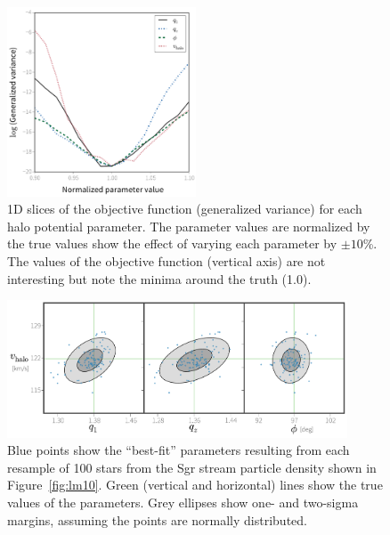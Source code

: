\begin{figure}[t]
\begin{center}
\includegraphics[width=0.5\textwidth]{figures/ch1/fig4.pdf}
\caption{ 1D slices of the objective function (generalized variance) for each halo potential parameter. The parameter values are normalized by the true values show the effect of varying each parameter by $\pm10$\%. The values of the objective function (vertical axis) are not interesting but note the minima around the truth (1.0).}\label{fig:objective}
\end{center}
\end{figure}

\begin{figure}[t]
\centering\includegraphics[width=0.9\textwidth,trim=0 0 0 0, clip]{figures/ch1/fig5.pdf}
\caption{ Blue points show the ``best-fit'' parameters resulting from each resample of 100 stars from the Sgr stream particle density shown in Figure~\ref{fig:lm10}. Green (vertical and horizontal) lines show the true values of the parameters. Grey ellipses show one- and two-sigma margins, assuming the points are normally distributed. }\label{fig:bootstrap}
\end{figure}	

